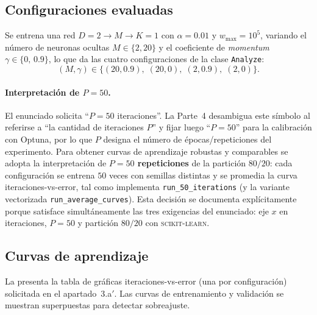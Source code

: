 \documentclass[11pt,a4paper]{article}
\begin{document}
\subsection{Configuraciones evaluadas}

Se entrena una red $D{=}2\to M\to K{=}1$ con $\alpha=0.01$ y $w_{\max}=10^5$,
variando el número de neuronas ocultas $M\in\{2,20\}$ y el coeficiente de
\emph{momentum} $\gamma\in\{0,\,0.9\}$, lo que da las cuatro configuraciones de
la clase \texttt{Analyze}:
\begin{equation*}
  (M,\gamma)\in\bigl\{(20,0.9),\;(20,0),\;(2,0.9),\;(2,0)\bigr\}.
\end{equation*}

\paragraph{Interpretación de $P=50$.}
El enunciado solicita ``$P=50$ iteraciones''. La Parte~4 desambigua este símbolo
al referirse a ``la cantidad de iteraciones $P$'' y fijar luego ``$P=50$'' para
la calibración con Optuna, por lo que $P$ designa el número de épocas/repeticiones
del experimento. Para obtener curvas de aprendizaje robustas y comparables se
adopta la interpretación de \textbf{$P=50$ repeticiones} de la partición
$80/20$: cada configuración se entrena $50$ veces con semillas distintas y se
promedia la curva iteraciones-vs-error, tal como implementa
\texttt{run\_50\_iterations} (y la variante vectorizada
\texttt{run\_average\_curves}). Esta decisión se documenta explícitamente porque
satisface simultáneamente las tres exigencias del enunciado: eje $x$ en
iteraciones, $P=50$ y partición $80/20$ con \textsc{scikit-learn}.

\subsection{Curvas de aprendizaje}

La  presenta la tabla de gráficas iteraciones-vs-error (una
por configuración) solicitada en el apartado~3.a$'$. Las curvas de
entrenamiento y validación se muestran superpuestas para detectar
sobreajuste.

\end{document}

